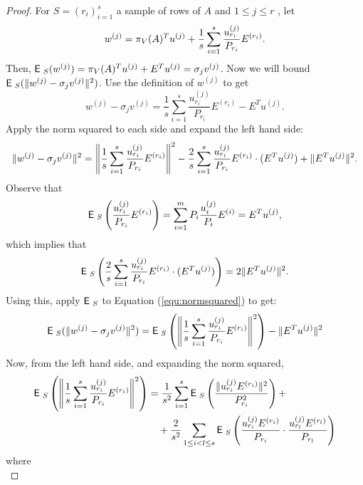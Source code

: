 \documentclass{book}
\numberwithin{exercise}{chapter}
\begin{document}
\begin{proof}
For $S = (r_i)_{i=1}^s$ a sample of rows of $A$ and $1 \leq j \leq
r$%
, let
\[
w^{(j)} = \pi_V(A)^T {u^{(j)}} + \frac{1}{s}\sum_{i=1}^s
\frac{u_{r_i}^{(j)}}{P_{r_i}} E^{(r_i)}.
\]
Then, $\hbox{{\sf E}\;}_{S}(w^{(j)}) = \pi_V(A)^T {u^{(j)}} + E^T u^{(j)} =
\sigma_j v^{(j)}$. Now we will bound $\hbox{{\sf E}\;}_{S} (\|w^{(j)} -
\sigma_j v^{(j)}\|^2)$. Use the definition of $w^{(j)}$ to get
\[
w^{(j)} - \sigma_j v^{(j)}
    = \frac{1}{s}\sum_{i=1}^s
\frac{u_{r_i}^{(j)}}{P_{r_i}} E^{(r_i)} - E^T u^{(j)}.
\]
Apply the norm squared to each side and expand the left hand side:
\begin{equation}\label{equ:normsquared}
\|w^{(j)} - \sigma_j v^{(j)}\|^2 =
\left\|\frac{1}{s}\sum_{i=1}^s \frac{u_{r_i}^{(j)}}{P_{r_i}}
E^{(r_i)}\right\|^2 - \frac{2}{s} \sum_{i=1}^s
\frac{u_{r_i}^{(j)}}{P_{r_i}} E^{(r_i)} \cdot (E^T u^{(j)}) +
\|E^T u^{(j)}\|^2.
\end{equation}
Observe that
\begin{equation}\label{equ:intermediate5}
\hbox{{\sf E}\;}_{S} \left( \frac{u_{r_i}^{(j)}}{P_{r_i}} E^{(r_i)} \right) =
\sum_{i=1}^m P_i \frac{u_{i}^{(j)}}{P_{i}} E^{(i)} = E^T u^{(j)},
\end{equation}
which implies that
\[
\hbox{{\sf E}\;}_{S} \left( \frac{2}{s} \sum_{i=1}^s
\frac{u_{r_i}^{(j)}}{P_{r_i}} E^{(r_i)} \cdot (E^T u^{(j)})
\right) = 2 \|E^T u^{(j)}\|^2.
\]
Using this, apply $\hbox{{\sf E}\;}_{S}$ to Equation (\ref{equ:normsquared}) to
get:
\begin{equation}\label{equ:intermediate4}
\hbox{{\sf E}\;}_{S} (\|w^{(j)} - \sigma_j v^{(j)}\|^2)
    = \hbox{{\sf E}\;}_{S}\left(\left\|\frac{1}{s}\sum_{i=1}^s
\frac{u_{r_i}^{(j)}}{P_{r_i}} E^{(r_i)}\right\|^2\right) - \|E^T
u^{(j)}\|^2
\end{equation}
Now, from the left hand side, and expanding the norm squared,
\begin{equation}\label{equ:intermediate1}
\begin{aligned}
\hbox{{\sf E}\;}_{S}\left(\left\|\frac{1}{s}\sum_{i=1}^s
\frac{u_{r_i}^{(j)}}{P_{r_i}} E^{(r_i)}\right\|^2 \right)
    &= \frac{1}{s^2}
\sum_{i=1}^s \hbox{{\sf E}\;}_S\left(\frac{\|u_{r_i}^{(j)}
E^{(r_i)}\|^2}{P_{r_i}^2}\right) + \\ &\quad + \frac{2}{s^2}
\sum_{1\le i<l\le s} \hbox{{\sf E}\;}_S \left(\frac{u_{r_i}^{(j)}
E^{(r_i)}}{P_{r_i}} \cdot \frac{u_{r_l}^{(j)}
E^{(r_l)}}{P_{r_l}}\right)
\end{aligned}
\end{equation}
where
\begin{equation}\label{equ:intermediate2}

\end{equation}
\end{proof}
\end{document}
